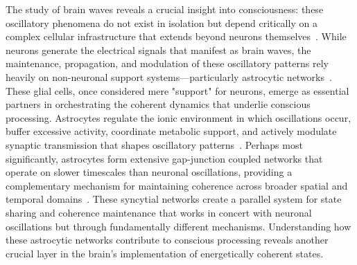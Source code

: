 The study of brain waves reveals a crucial insight into consciousness: these oscillatory phenomena do not exist in isolation but depend critically on a complex cellular infrastructure that extends beyond neurons themselves~\cite{Poskanzer2016, Verkhratsky2018}. While neurons generate the electrical signals that manifest as brain waves, the maintenance, propagation, and modulation of these oscillatory patterns rely heavily on non-neuronal support systems—particularly astrocytic networks~\cite{Khakh2015, Araque2014}. These glial cells, once considered mere "support" for neurons, emerge as essential partners in orchestrating the coherent dynamics that underlie conscious processing. Astrocytes regulate the ionic environment in which oscillations occur, buffer excessive activity, coordinate metabolic support, and actively modulate synaptic transmission that shapes oscillatory patterns~\cite{Araque2014, Rusakov2015}. Perhaps most significantly, astrocytes form extensive gap-junction coupled networks that operate on slower timescales than neuronal oscillations, providing a complementary mechanism for maintaining coherence across broader spatial and temporal domains~\cite{Giaume2010, Nagy2018}. These syncytial networks create a parallel system for state sharing and coherence maintenance that works in concert with neuronal oscillations but through fundamentally different mechanisms. Understanding how these astrocytic networks contribute to conscious processing reveals another crucial layer in the brain's implementation of energetically coherent states.
